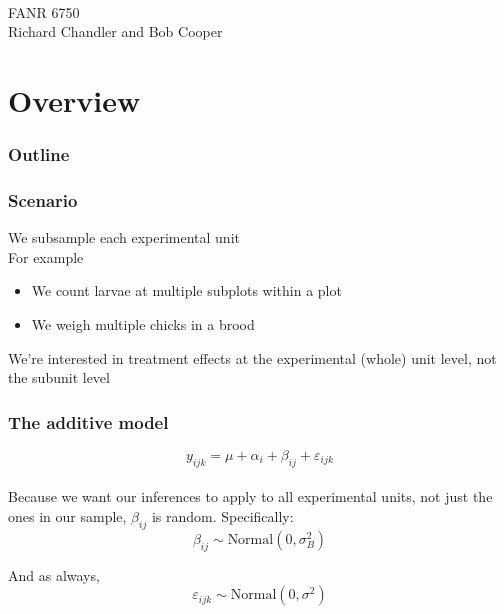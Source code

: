 \documentclass[color=usenames,dvipsnames]{beamer}\usepackage[]{graphicx}\usepackage[]{color}
\begin{document}



\begin{frame}[plain]
  \LARGE
  \centering
  {\color{RoyalBlue}{Lab 8 -- Nested Designs} \\}
  \vspace{1cm}
  \Large
  FANR 6750 \\
  \vfill
  \large
  Richard Chandler and Bob Cooper
\end{frame}







\section{Overview}



\begin{frame}
  \frametitle{Outline}
  \Large
\end{frame}




\begin{frame}
  \frametitle{Scenario}
  \large
  We subsample each experimental unit \\
  \pause
  \vfill
  For example
      \begin{itemize}
        \large
        \item We count larvae at multiple subplots within a plot
        \item We weigh multiple chicks in a brood
      \end{itemize}
  \pause
  \vfill
  We're interested in treatment effects at the experimental (whole) unit
  level, not the subunit level
\end{frame}




\begin{frame}
  \frametitle{The additive model}
  \large
\[
y_{ijk} = \mu + \alpha_i + \beta_{ij} + \varepsilon_{ijk}
\] \\
\vspace{1cm}
\pause
\large
Because we want our inferences to apply to all experimental units, not
just the ones in our sample, $\beta_{ij}$ is random.
\pause
\vfill
Specifically:
\[
\beta_{ij} \sim \mbox{Normal}(0, \sigma^2_B)
\]

\pause
\large
And as always,
\[
\varepsilon_{ijk} \sim \mbox{Normal}(0, \sigma^2)
\]
\end{frame}
\end{document}
